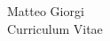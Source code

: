 \documentclass[10pt]{article} %
\begin{document}
\begin{paracol}{2} %


\parbox[top][0.12\textheight][c]{\linewidth}{ %
	\vspace{-0.04\textheight} %
	\centering %
    {\sffamily\Huge Matteo Giorgi}\\
    {\Large\color{headings} Curriculum Vitae}
}


%
%
%
%
%
%
%


\end{paracol}
\end{document}
